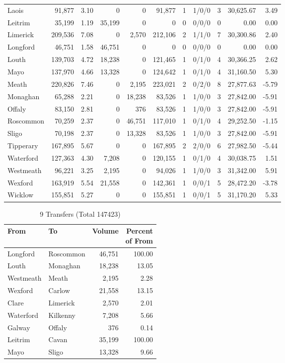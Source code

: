 \documentclass[a4paper]{article}
\begin{document}
\begin{longtable}{lrrrrrrlrrr}
Laois&91,877& 3.10&0&0&91,877&1&1/0/0&3&30,625.67& 3.49\\ 
Leitrim&35,199& 1.19&35,199&0&0&0&0/0/0&0& 0.00& 0.00\\ 
Limerick&209,536& 7.08&0&2,570&212,106&2&1/1/0&7&30,300.86& 2.40\\ 
Longford&46,751& 1.58&46,751&0&0&0&0/0/0&0& 0.00& 0.00\\ 
Louth&139,703& 4.72&18,238&0&121,465&1&0/1/0&4&30,366.25& 2.62\\ 
Mayo&137,970& 4.66&13,328&0&124,642&1&0/1/0&4&31,160.50& 5.30\\ 
Meath&220,826& 7.46&0&2,195&223,021&2&0/2/0&8&27,877.63&-5.79\\ 
Monaghan&65,288& 2.21&0&18,238&83,526&1&1/0/0&3&27,842.00&-5.91\\ 
Offaly&83,150& 2.81&0&376&83,526&1&1/0/0&3&27,842.00&-5.91\\ 
Roscommon&70,259& 2.37&0&46,751&117,010&1&0/1/0&4&29,252.50&-1.15\\ 
Sligo&70,198& 2.37&0&13,328&83,526&1&1/0/0&3&27,842.00&-5.91\\ 
Tipperary&167,895& 5.67&0&0&167,895&2&2/0/0&6&27,982.50&-5.44\\ 
Waterford&127,363& 4.30&7,208&0&120,155&1&0/1/0&4&30,038.75& 1.51\\ 
Westmeath&96,221& 3.25&2,195&0&94,026&1&1/0/0&3&31,342.00& 5.91\\ 
Wexford&163,919& 5.54&21,558&0&142,361&1&0/0/1&5&28,472.20&-3.78\\ 
Wicklow&155,851& 5.27&0&0&155,851&1&0/0/1&5&31,170.20& 5.33\\ 
\end{longtable}

\begin{table}[htbp]
\caption{9 Transfers (Total 147423)}
\centering
\begin{tabular}{llrr} \toprule
From &To &Volume &\shortstack{Percent\\of From} \\ \midrule
Longford&Roscommon&46,751&100.00\\ 
Louth&Monaghan&18,238&13.05\\ 
Westmeath&Meath&2,195& 2.28\\ 
Wexford&Carlow&21,558&13.15\\ 
Clare&Limerick&2,570& 2.01\\ 
Waterford&Kilkenny&7,208& 5.66\\ 
Galway&Offaly&376& 0.14\\ 
Leitrim&Cavan&35,199&100.00\\ 
Mayo&Sligo&13,328& 9.66\\ 
\bottomrule
\end{tabular}
\end{table}
\end{document}
